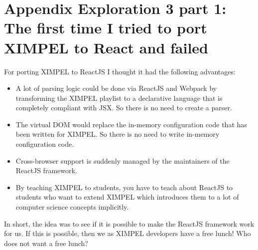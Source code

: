 \chapter{Appendix Exploration 3 part 1: The first time I tried to port XIMPEL to React and failed}
\label{chap:exploration3_appendix_part1}

For porting XIMPEL to ReactJS I thought it had the following advantages:
\begin{itemize}
    \item A lot of parsing logic could be done via ReactJS and Webpack by transforming the XIMPEL playlist to a declarative language that is completely compliant with JSX. So there is no need to create a parser.
    \item The virtual DOM would replace the in-memory configuration code that has been written for XIMPEL. So there is no need to write in-memory configuration code.
    \item Cross-browser support is suddenly managed by the maintainers of the ReactJS framework.
    \item By teaching XIMPEL to students, you have to teach about ReactJS to students who want to extend XIMPEL which introduces them to a lot of computer science concepts implicitly.
\end{itemize}



In short, the idea was to see if it is possible to make the ReactJS framework work for us. If this is possible, then we as XIMPEL developers have a free lunch! Who does not want a free lunch?


